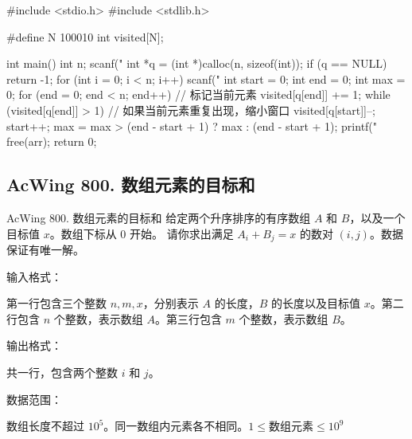 \begin{mycpptwocol}[最长连续不重复子序列]
    #include <stdio.h>
    #include <stdlib.h>

    #define N 100010
    int visited[N];

    int main() {
        int n;
        scanf("%
        int *q = (int *)calloc(n, sizeof(int));
        if (q == NULL) {
            return -1;
        }
        for (int i = 0; i < n; i++) {
            scanf("%
        }
        int start = 0;
        int end = 0;
        int max = 0;
        for (end = 0; end < n; end++) {
            // 标记当前元素
            visited[q[end]] += 1;
            while (visited[q[end]] > 1) {
                // 如果当前元素重复出现，缩小窗口
                visited[q[start]]--;
                start++;
            }
            max = max > (end - start + 1) ? max : (end - start + 1);
        }
        printf("%
        free(arr);
        return 0;
    }
\end{mycpptwocol}

\subsection{AcWing 800. 数组元素的目标和}
\begin{titledbox}{AcWing 800. 数组元素的目标和}
    给定两个升序排序的有序数组 $A$ 和 $B$，以及一个目标值 $x$。数组下标从 $0$ 开始。
    请你求出满足 $A_i + B_j = x$ 的数对 $(i, j)$。数据保证有唯一解。

    输入格式：

    第一行包含三个整数 $n,m,x$，分别表示 $A$ 的长度，$B$ 的长度以及目标值 $x$。第二行包含 $n$ 个整数，表示数组 $A$。第三行包含 $m$ 个整数，表示数组 $B$。

    输出格式：

    共一行，包含两个整数 $i$ 和 $j$。

    数据范围：

    数组长度不超过 $10^5$。同一数组内元素各不相同。$1 \le \text{数组元素} \le 10^9$

    \begin{inputblock}
         \\
         \\
    \end{inputblock}
    \begin{outputblock}
    \end{outputblock}
\end{titledbox}

